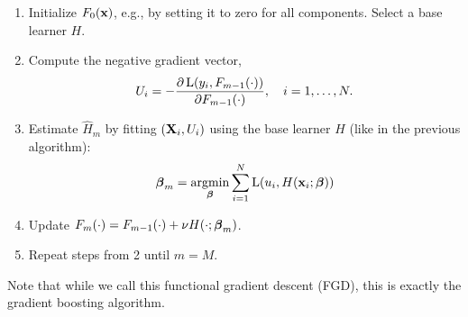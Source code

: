 \begin{enumerate}
    \item Initialize $F_0(\mathbf{x})$, e.g., by setting it to zero for all components. Select a base learner $H$.
    \item Compute the negative gradient vector,
        \begin{equation*}
            U_i=-\frac{\partial \operatorname{L}(y_i,F_{m-1}(\cdot))}{\partial F_{m-1}(\cdot)},\quad i=1,\dotsc,N.
        \end{equation*}
    \item Estimate $\hat{H}_m$ by fitting $(\mathbf{X}_i,U_i)$ using the base learner $H$ (like in the previous algorithm):
        \begin{equation*}
            \boldsymbol{\beta}_m=\operatorname*{argmin}_{\boldsymbol{\beta}}\sum_{i=1}^N\operatorname{L}(u_i,H(\mathbf{x}_i;\boldsymbol{\beta}))
        \end{equation*}
    \item Update $F_m(\cdot)=F_{m-1}(\cdot)+\nu H(\cdot;\boldsymbol{\beta}_m)$.
    \item Repeat steps from 2 until $m=M$.
\end{enumerate}
Note that while we call this functional gradient descent (FGD), this is exactly the gradient boosting algorithm.
